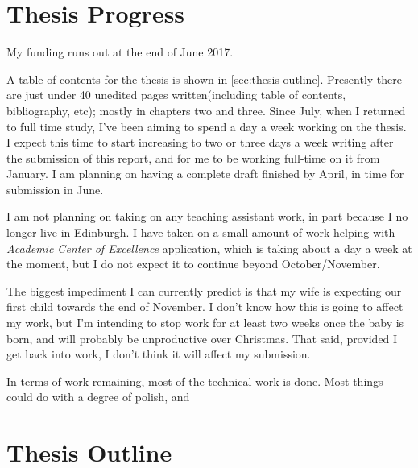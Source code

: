 \documentclass[a4paper]{scrartcl}
\begin{document}
\section{Thesis Progress}
\label{sec:thesis}

My funding runs out at the end of June 2017.

A table of contents for the thesis is shown in \autoref{sec:thesis-outline}.
Presently there are just under 40 unedited pages written(including table of contents,
bibliography, etc); mostly in chapters two and three. Since July, when I
returned to full time study, I've been aiming to spend a day a week working on
the thesis.  I expect this time to start increasing to two or three days a week
writing after the submission of this report, and for me to be working full-time
on it from January.  I am planning on having a complete draft finished by April,
in time for submission in June.

I am not planning on taking on any teaching assistant work, in part because I
no longer live in Edinburgh.  I have taken on a small amount of work helping
with \emph{Academic Center of Excellence} application, which is taking about a
day a week at the moment, but I do not expect it to continue beyond
October/November.

The biggest impediment I can currently predict is that my wife is expecting our
first child towards the end of November.  I don't know how this is going to
affect my work, but I'm intending to stop work for at least two weeks once the
baby is born, and will probably be unproductive over Christmas.  That said,
provided I get back into work, I don't think it will affect my submission.

In terms of work remaining, most of the technical work is done.  Most things
could do with a degree of polish, and 


 
\pagebreak
\appendix
\section{Thesis Outline}
\label{sec:thesis-outline}
\end{document}
